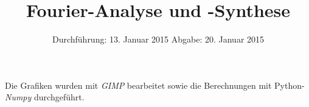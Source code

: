 
\subject{Anfängerpraktikum Versuch V351}
\title{Fourier-Analyse und -Synthese}
\date{
  Durchführung: 13. Januar 2015
  \hspace{3em}
  Abgabe: 20. Januar 2015
}


\maketitle
\thispagestyle{empty}
\newpage





\printbibliography
Die Grafiken wurden mit \textit{GIMP}\cite{gimp} bearbeitet sowie die Berechnungen mit Python-\textit{Numpy} durchgeführt.

